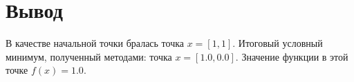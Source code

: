 \section{Вывод}
    В качестве начальной точки бралась точка $x = [1, 1]$.
    Итоговый условный минимум, полученный методами:
    точка $x = [1.0, 0.0]$.
    Значение функции в этой точке $f(x) = 1.0$.